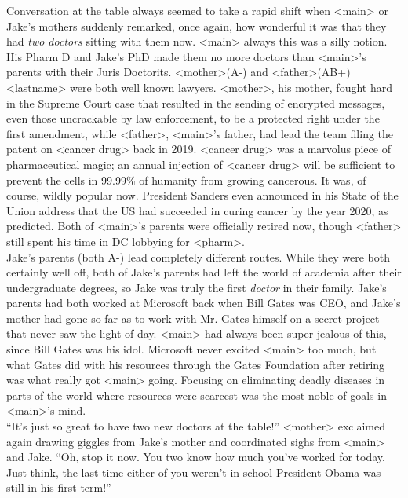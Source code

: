 \documentclass[12pt,openany]{memoir}
\begin{document}
Conversation at the table always seemed to take a rapid shift when <main> or Jake's mothers suddenly remarked, once again, how wonderful it was that they had \textit{two doctors} sitting with them now.
<main> always this was a silly notion.
His Pharm D and Jake's PhD made them no more doctors than <main>'s parents with their Juris Doctorits.
<mother>(A-) and <father>(AB+) <lastname> were both well known lawyers.
<mother>, his mother, fought hard in the Supreme Court case that resulted in the sending of encrypted messages, even those uncrackable by law enforcement, to be a protected right under the first amendment, while <father>, <main>'s father, had lead the team filing the patent on <cancer drug> back in 2019.
<cancer drug> was a marvolus piece of pharmaceutical magic; an annual injection of <cancer drug> will be sufficient to prevent the cells in 99.99\% of humanity from growing cancerous.
It was, of course, wildly popular now.
President Sanders even announced in his State of the Union address that the US had succeeded in curing cancer by the year 2020, as predicted.
Both of <main>'s parents were officially retired now, though <father> still spent his time in DC lobbying for <pharm>.
\\

Jake's parents (both A-) lead completely different routes.
While they were both certainly well off, both of Jake's parents had left the world of academia after their undergraduate degrees, so Jake was truly the first \textit{doctor} in their family.
Jake's parents had both worked at Microsoft back when Bill Gates was CEO, and Jake's mother had gone so far as to work with Mr. Gates himself on a secret project that never saw the light of day.
<main> had always been super jealous of this, since Bill Gates was his idol.
Microsoft never excited <main> too much, but what Gates did with his resources through the Gates Foundation after retiring was what really got <main> going.
Focusing on eliminating deadly diseases in parts of the world where resources were scarcest was the most noble of goals in <main>'s mind.
\\

``It's just so great to have two new doctors at the table!'' <mother> exclaimed again drawing giggles from Jake's mother and coordinated sighs from <main> and Jake.
``Oh, stop it now.
You two know how much you've worked for today.
Just think, the last time either of you weren't in school President Obama was still in his first term!''
\\
\end{document}
